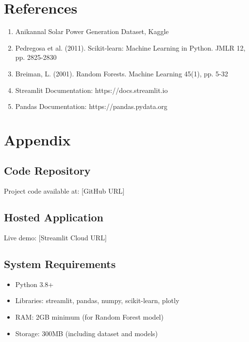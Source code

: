 \documentclass[12pt,a4paper]{article}
\begin{document}
\section{References}

\begin{enumerate}
    \item Anikannal Solar Power Generation Dataset, Kaggle
    \item Pedregosa et al. (2011). Scikit-learn: Machine Learning in Python. JMLR 12, pp. 2825-2830
    \item Breiman, L. (2001). Random Forests. Machine Learning 45(1), pp. 5-32
    \item Streamlit Documentation: https://docs.streamlit.io
    \item Pandas Documentation: https://pandas.pydata.org
\end{enumerate}

\section{Appendix}

\subsection{Code Repository}
Project code available at: [GitHub URL]

\subsection{Hosted Application}
Live demo: [Streamlit Cloud URL]

\subsection{System Requirements}
\begin{itemize}
    \item Python 3.8+
    \item Libraries: streamlit, pandas, numpy, scikit-learn, plotly
    \item RAM: 2GB minimum (for Random Forest model)
    \item Storage: 300MB (including dataset and models)
\end{itemize}
\end{document}

